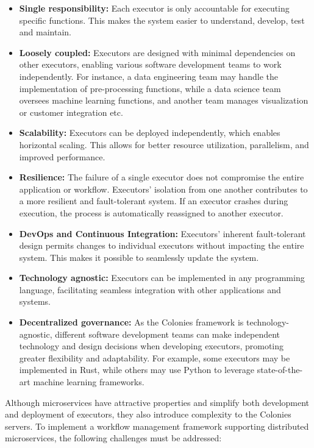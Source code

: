 \documentclass{article}
\begin{document}
\begin{itemize}
\item \textbf{Single responsibility:} Each executor is only accountable for executing specific functions. This makes the system easier to understand, develop, test and maintain.  
\item \textbf{Loosely coupled:} Executors are designed with minimal dependencies on other executors, enabling various software development teams to work independently. For instance, a data engineering team may handle the implementation of pre-processing functions, while a data science team oversees machine learning functions, and another team manages visualization or customer integration etc.
\item \textbf{Scalability:} Executors can be deployed independently, which enables horizontal scaling. This allows for better resource utilization, parallelism, and improved performance. 
\item \textbf{Resilience:} The failure of a single executor does not compromise the entire application or workflow. Executors' isolation from one another contributes to a more resilient and fault-tolerant system. If an executor crashes during execution, the process is automatically reassigned to another executor.
\item \textbf{DevOps and Continuous Integration:} Executors' inherent fault-tolerant design permits changes to individual executors without impacting the entire system. This makes it possible to seamlessly update the system. 
\item \textbf{Technology agnostic:} Executors can be implemented in any programming language, facilitating seamless integration with other applications and systems.
\item \textbf{Decentralized governance:} As the Colonies framework is technology-agnostic, different software development teams can make independent technology and design decisions when developing executors, promoting greater flexibility and adaptability. For example, some executors may be implemented in Rust, while others may use Python to leverage state-of-the-art machine learning frameworks.
\end{itemize}

Although microservices have attractive properties and simplify both development and deployment of executors, they also introduce complexity to the Colonies servers. To implement a workflow management framework supporting distributed microservices, the following challenges must be addressed:
\end{document}
